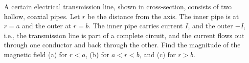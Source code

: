 A certain electrical transmission line, shown in cross-section,
consists of two hollow, coaxial pipes. Let $r$ be the distance from
the axis.  The inner pipe is at $r=a$ and the outer at $r=b$. The
inner pipe carries current $I$, and the outer $-I$, i.e., the transmission line
is part of a complete circuit, and the current flows out through one
conductor and back through the other.  Find the magnitude of the
magnetic field (a) for $r<a$, (b) for $a<r<b$, and (c) for $r>b$.
